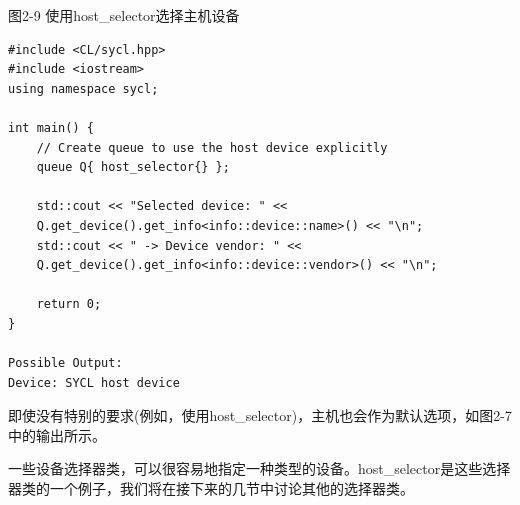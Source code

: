 \hspace*{\fill} \par %
图2-9 使用host\_selector选择主机设备
\begin{lstlisting}[caption={}]
#include <CL/sycl.hpp>
#include <iostream>
using namespace sycl;

int main() {
	// Create queue to use the host device explicitly
	queue Q{ host_selector{} };
	
	std::cout << "Selected device: " <<
	Q.get_device().get_info<info::device::name>() << "\n";
	std::cout << " -> Device vendor: " <<
	Q.get_device().get_info<info::device::vendor>() << "\n";
	
	return 0;
}

Possible Output:
Device: SYCL host device
\end{lstlisting}

即使没有特别的要求(例如，使用host\_selector)，主机也会作为默认选项，如图2-7中的输出所示。\par

一些设备选择器类，可以很容易地指定一种类型的设备。host\_selector是这些选择器类的一个例子，我们将在接下来的几节中讨论其他的选择器类。\par






